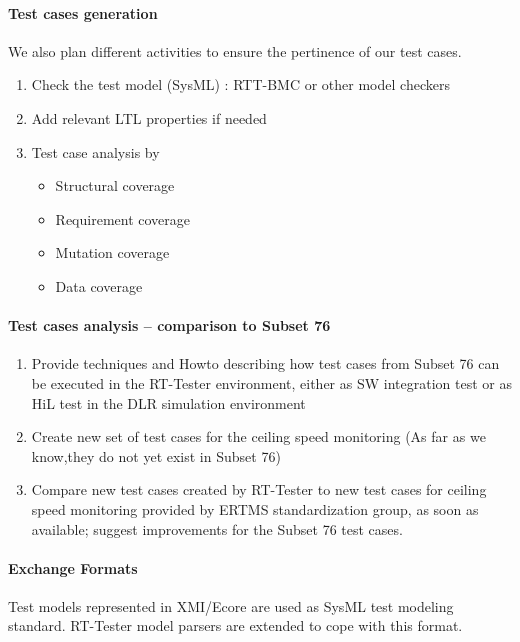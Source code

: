 \documentclass{template/openetcs_report}
\begin{document}
\paragraph{Test cases generation}
We also plan different activities to ensure the pertinence of our test cases.
\begin{enumerate}
\item Check the test model (SysML) : RTT-BMC or other model checkers
\item Add relevant LTL properties if needed
\item Test case analysis by 
  \begin{itemize}
    \item Structural coverage
    \item Requirement coverage
    \item Mutation coverage 
    \item Data coverage
  \end{itemize}
\end{enumerate}

\paragraph{Test cases analysis -- comparison to Subset 76}
\begin{enumerate}
\item Provide techniques and Howto describing how test cases from
  Subset 76 can be executed in the RT-Tester environment, either as SW
  integration test or as HiL test in the DLR simulation environment
\item Create new set of test cases for the ceiling speed monitoring
  (As far as we know,they do not yet exist in Subset 76)
\item Compare new test cases created by RT-Tester to new test cases
  for ceiling speed monitoring provided by ERTMS standardization
  group, as soon as available; suggest improvements for the Subset 76
  test cases. 
 \end{enumerate}


\paragraph{Exchange Formats}
Test models represented in XMI/Ecore are used as SysML test modeling
standard. RT-Tester model parsers are extended to cope with this
format.
\end{document}

